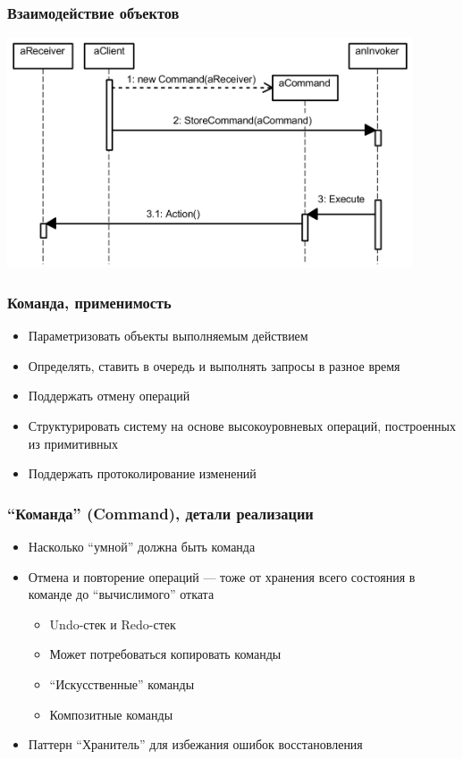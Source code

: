 \documentclass{../../slides-style}
\begin{document}
    \begin{frame}
        \frametitle{Взаимодействие объектов}
        \begin{center}
            \includegraphics[width=0.9\textwidth]{commandSequence.png}
        \end{center}
    \end{frame}

    \begin{frame}
        \frametitle{Команда, применимость}
        \begin{itemize}
            \item Параметризовать объекты выполняемым действием
            \item Определять, ставить в очередь и выполнять запросы в разное время
            \item Поддержать отмену операций
            \item Структурировать систему на основе высокоуровневых операций, построенных из примитивных
            \item Поддержать протоколирование изменений
        \end{itemize}
    \end{frame}

    \begin{frame}
        \frametitle{``Команда'' (Command), детали реализации}
        \begin{itemize}
            \item Насколько ``умной'' должна быть команда
            \item Отмена и повторение операций --- тоже от хранения всего состояния в команде до ``вычислимого'' отката
            \begin{itemize}
                \item Undo-стек и Redo-стек
                \item Может потребоваться копировать команды
                \item ``Искусственные'' команды
                \item Композитные команды
            \end{itemize}
            \item Паттерн ``Хранитель'' для избежания ошибок восстановления
        \end{itemize}
    \end{frame}
\end{document}
